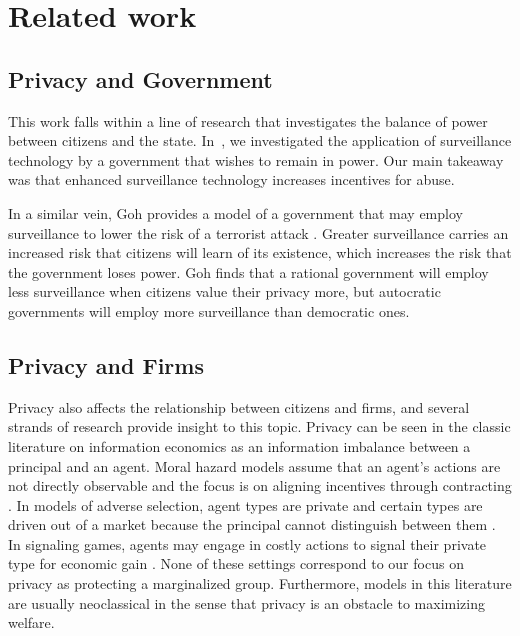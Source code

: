 
\section{Related work}
\label{sec:related}

\subsection{Privacy and Government}
This work falls within a line of research that investigates the balance of power between citizens and the state. In~\cite{laskowskigovernment}, we investigated the application of surveillance technology by a government that wishes to remain in power.  Our main takeaway was that enhanced surveillance technology increases incentives for abuse. 

In a similar vein, Goh provides a model of a government that may employ surveillance to lower the risk of a terrorist attack \cite{goh2015prosperity}.  Greater surveillance carries an increased risk that citizens will learn of its existence, which increases the risk that the government loses power.  Goh finds that a rational government will employ less surveillance when citizens value their privacy more, but autocratic governments will employ more surveillance than democratic ones.


\subsection{Privacy and Firms}

Privacy also affects the relationship between citizens and firms, and several strands of research provide insight to this topic.  Privacy can be seen in the classic literature on information economics as an information imbalance between a principal and an agent.  Moral hazard models assume that an agent's actions are not directly observable and the focus is on aligning incentives through contracting \cite{holmstrom1979moral}\cite{stiglitz1981credit}.  In models of adverse selection, agent types are private and certain types are driven out of a market because the principal cannot distinguish between them \cite{akerlof1995market}.  In signaling games, agents may engage in costly actions to signal their private type for economic gain \cite{spence1973job}.  None of these settings correspond to our focus on privacy as protecting a marginalized group.  Furthermore, models in this literature are usually neoclassical in the sense that privacy is an obstacle to maximizing welfare. 

